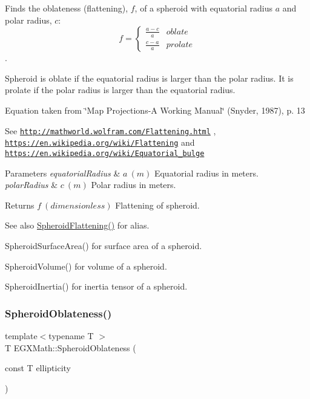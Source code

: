 Finds the oblateness (flattening), $f$, of a spheroid with equatorial radius $a$ and polar radius, $c$\+: \[ f =\begin{cases} \frac{a-c}{a}{} & oblate \\ \frac{c-a}{a} & prolate \end{cases} \]. 

Spheroid is oblate if the equatorial radius is larger than the polar radius. It is prolate if the polar radius is larger than the equatorial radius.

Equation taken from \char`\"{}\+Map Projections-\/\+A Working Manual\char`\"{} (Snyder, 1987), p. 13

See \href{http://mathworld.wolfram.com/Flattening.html}{\tt http\+://mathworld.\+wolfram.\+com/\+Flattening.\+html} , \href{https://en.wikipedia.org/wiki/Flattening}{\tt https\+://en.\+wikipedia.\+org/wiki/\+Flattening} and \href{https://en.wikipedia.org/wiki/Equatorial_bulge}{\tt https\+://en.\+wikipedia.\+org/wiki/\+Equatorial\+\_\+bulge} 
\begin{DoxyParams}{Parameters}
{\em equatorial\+Radius} & $ a\ (m)$ Equatorial radius in meters. \\
\hline
{\em polar\+Radius} & $ c\ (m)$ Polar radius in meters. \\
\hline
\end{DoxyParams}
\begin{DoxyReturn}{Returns}
$ f\ (dimensionless)$ Flattening of spheroid. 
\end{DoxyReturn}
\begin{DoxySeeAlso}{See also}
\mbox{\hyperlink{group___e_g_x_math-_geometry-3_d-_spheroid-_flattening_gacd0d1ae60af3a7f1a09ed2f65636c132}{Spheroid\+Flattening()}} for alias. 

Spheroid\+Surface\+Area() for surface area of a spheroid. 

Spheroid\+Volume() for volume of a spheroid. 

Spheroid\+Inertia() for inertia tensor of a spheroid. 
\end{DoxySeeAlso}
\mbox{\label{group___e_g_x_math-_geometry-3_d-_spheroid-_flattening_gaf2530de595124e75a7f58482d617cfce}} 
\subsubsection{\texorpdfstring{Spheroid\+Oblateness()}{SpheroidOblateness()}\hspace{0.1cm}{\footnotesize\ttfamily [2/2]}}
{\footnotesize\ttfamily template$<$typename T $>$ \\
T E\+G\+X\+Math\+::\+Spheroid\+Oblateness (\begin{DoxyParamCaption}\item[{const T}]{ellipticity }\end{DoxyParamCaption})}



